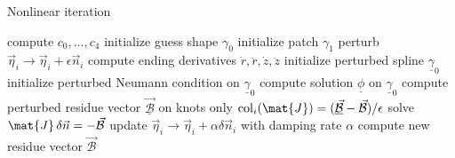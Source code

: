 \documentclass{jfm}
\begin{document}
\begin{algorithm}
  \caption{Nonlinear iteration \label{alg:??}}
  \begin{algorithmic}[1]
     
    \State compute $c_0,\dots , c_4$ 
    \State initialize guess shape $\gamma_0$
    \State initialize patch $\gamma_1$
     
    \State perturb $\vec{\eta}_i \to \vec{\eta}_i+\epsilon \vec{n}_i$
    \State compute ending derivatives $\dot{r},\ddot{r},\dot{z},\ddot{z}$
    \State initialize perturbed spline $\underline{\gamma}_0$    
     \State initialize perturbed Neumann condition on $\underline{\gamma}_0$    
    \State compute solution $\underline{\phi}$ on $\underline{\gamma}_0$    
     \State compute perturbed residue vector $\underline{\vec{\mathcal{B}}}$ on knots only
     \State $\mathrm{col}_i(\mat{J}) = (\underline{\vec{\mathcal{B}}}-\vec{\mathcal{B}})/\epsilon$
    \EndFor
    \State solve $\mat{J}\, \delta\vec{n}=-\vec{\mathcal{B}}$
    \State update $\vec{\eta}_i \to \vec{\eta}_i+\alpha \delta\vec{n}_i$ with damping rate $\alpha$
    \State compute new residue vector $\vec{\mathcal{B}}$
    \EndWhile        
%    
%    
%    
    \EndFunction
  \end{algorithmic}
\end{algorithm}

















\end{document}
